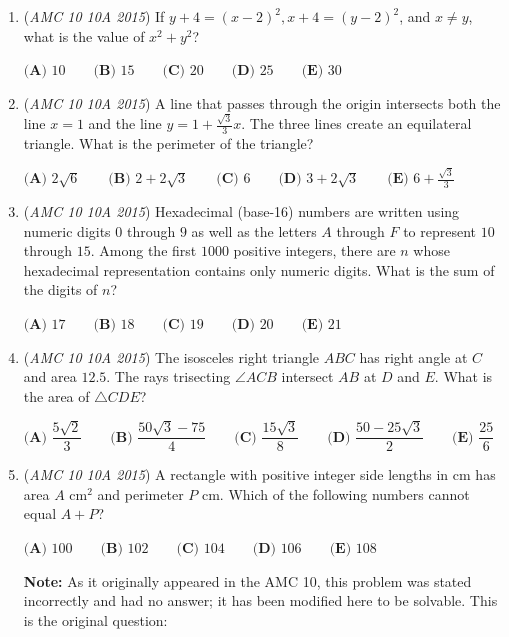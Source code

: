 \begin{enumerate}
 $\textbf{(A) }0\qquad\textbf{(B) }1\qquad\textbf{(C) }2\qquad\textbf{(D) }3\qquad\textbf{(E) }\text{infinitely many}$


	\item (\textit{AMC 10 10A 2015}) If $y+4 = (x-2)^2, x+4 = (y-2)^2$, and $x \neq y$, what is the value of $x^2+y^2$?


 $\textbf{(A) }10\qquad\textbf{(B) }15\qquad\textbf{(C) }20\qquad\textbf{(D) }25\qquad\textbf{(E) }\text{30}$


	\item (\textit{AMC 10 10A 2015}) A line that passes through the origin intersects both the line $x=1$ and the line $y=1+\frac{\sqrt{3}}{3}x$. The three lines create an equilateral triangle. What is the perimeter of the triangle?


 $\textbf{(A) }2\sqrt{6}\qquad\textbf{(B) }2+2\sqrt{3}\qquad\textbf{(C) }6\qquad\textbf{(D) }3+2\sqrt{3}\qquad\textbf{(E) }6+\frac{\sqrt{3}}{3}$


	\item (\textit{AMC 10 10A 2015}) Hexadecimal (base-16) numbers are written using numeric digits $0$ through $9$ as well as the letters $A$ through $F$ to represent $10$ through $15$. Among the first $1000$ positive integers, there are $n$ whose hexadecimal representation contains only numeric digits. What is the sum of the digits of $n$?


 $\textbf{(A) }17\qquad\textbf{(B) }18\qquad\textbf{(C) }19\qquad\textbf{(D) }20\qquad\textbf{(E) }21$


	\item (\textit{AMC 10 10A 2015}) The isosceles right triangle $ABC$ has right angle at $C$ and area $12.5$. The rays trisecting $\angle ACB$ intersect $AB$ at $D$ and $E$. What is the area of $\bigtriangleup CDE$?


 $\textbf{(A) }\dfrac{5\sqrt{2}}{3}\qquad\textbf{(B) }\dfrac{50\sqrt{3}-75}{4}\qquad\textbf{(C) }\dfrac{15\sqrt{3}}{8}\qquad\textbf{(D) }\dfrac{50-25\sqrt{3}}{2}\qquad\textbf{(E) }\dfrac{25}{6}$


	\item (\textit{AMC 10 10A 2015}) A rectangle with positive integer side lengths in $\text{cm}$ has area $A$ $\text{cm}^2$ and perimeter $P$ $\text{cm}$. Which of the following numbers cannot equal $A+P$?


 $\textbf{(A) }100\qquad\textbf{(B) }102\qquad\textbf{(C) }104\qquad\textbf{(D) }106\qquad\textbf{(E) }108$


 \textbf{Note:} As it originally appeared in the AMC 10, this problem was stated incorrectly and had no answer; it has been modified here to be solvable. This is the original question:



\end{enumerate}
